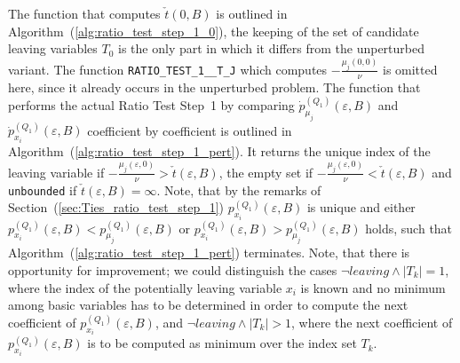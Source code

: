 \documentclass[a4paper]{article}
\newcommand{\pmu}[2]{\ensuremath{p_{\mu_{j}}^{(#1)}(\varepsilon, #2)}}
\newcommand{\pmuz}[2]{\ensuremath{\dot{p}_{\mu_{j}}^{(#1)}(\varepsilon, #2)}}
\newcommand{\px}[3]{\ensuremath{p_{x_{#1}}^{(#2)}(\varepsilon, #3)}}
\newcommand{\pxz}[3]{\ensuremath{\dot{p}_{x_{#1}}^{(#2)}(\varepsilon, #3)}}
\begin{document}
The function that computes $\check{t}(0, B)$ is outlined in
Algorithm~(\ref{alg:ratio_test_step_1_0}), the keeping of the set of candidate
leaving variables $T_{0}$ is the only part in which it differs from the
unperturbed variant.
The function \texttt{RATIO\_TEST\_1\_\_T\_J}
which computes $-\frac{\mu_{j}(0,0)}{\nu}$ is omitted here, since it already
occurs in the unperturbed problem.
The function that performs the actual Ratio Test Step~1 by comparing
$\pmuz{Q_{1}}{B}$ and $\pxz{i}{Q_{1}}{B}$
coefficient by coefficient is outlined in
Algorithm~(\ref{alg:ratio_test_step_1_pert}). It returns the unique index of
the leaving variable if
$-\frac{\mu_{j}(\varepsilon, 0)}{\nu} > \check{t}(\varepsilon,B)$, the empty
set if $-\frac{\mu_{j}(\varepsilon, 0)}{\nu} < \check{t}(\varepsilon,B)$ 
and \texttt{unbounded} if $\check{t}(\varepsilon, B)=\infty$.
Note, that by the remarks of
Section~(\ref{sec:Ties_ratio_test_step_1}) \px{i}{Q_{1}}{B} is unique and
either $\px{i}{Q_{1}}{B} < \pmu{Q_{1}}{B}$ or
$\px{i}{Q_{1}}{B} > \pmu{Q_{1}}{B}$
holds, such that Algorithm~(\ref{alg:ratio_test_step_1_pert}) terminates.
Note, that there is opportunity for improvement; we could distinguish the cases
$\neg leaving \wedge \left|T_{k}\right|=1$, where the index of the potentially
leaving variable $x_{i}$ is known and no minimum among basic variables has to
be determined in order to compute the next coefficient of \px{i}{Q_{1}}{B}, and
$\neg leaving \wedge \left|T_{k}\right|>1$, where the next coefficient of
\px{i}{Q_{1}}{B} is to be computed as minimum over the index set $T_{k}$.
\end{document}
